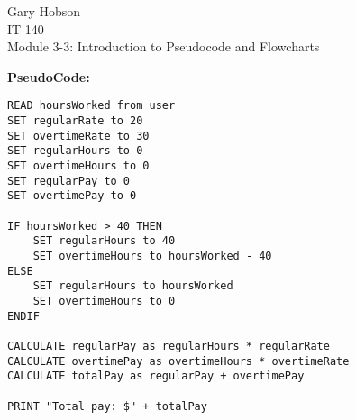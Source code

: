 \documentclass[12pt]{article}
\begin{document}
\begin{center}
    Gary Hobson \\
    IT 140 \\
    Module 3-3: Introduction to Pseudocode and Flowcharts
\end{center}

\textbf{PseudoCode:}

\begin{lstlisting}
READ hoursWorked from user
SET regularRate to 20
SET overtimeRate to 30
SET regularHours to 0
SET overtimeHours to 0
SET regularPay to 0
SET overtimePay to 0

IF hoursWorked > 40 THEN
    SET regularHours to 40
    SET overtimeHours to hoursWorked - 40
ELSE
    SET regularHours to hoursWorked
    SET overtimeHours to 0
ENDIF

CALCULATE regularPay as regularHours * regularRate
CALCULATE overtimePay as overtimeHours * overtimeRate
CALCULATE totalPay as regularPay + overtimePay

PRINT "Total pay: $" + totalPay
\end{lstlisting}

\clearpage %
\end{document}

